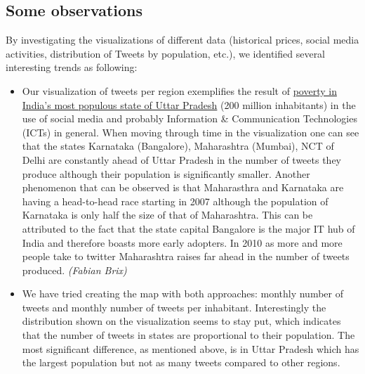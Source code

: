 \subsection*{Some observations}
By investigating the visualizations of different data (historical prices, social media activities, distribution of Tweets by population, etc.), we identified several interesting trends as following:
\begin{itemize}
\item Our visualization of tweets per region exemplifies the result of \href{http://web.worldbank.org/WBSITE/EXTERNAL/TOPICS/EXTPOVERTY/EXTPA/0,,contentMDK:20208963~menuPK:435735~pagePK:148956~piPK:216618~theSitePK:430367,00.html}{poverty in India's most populous state of Uttar Pradesh} (200 million inhabitants) in the use of social media and probably Information \& Communication Technologies (ICTs) in general. When moving through time in the visualization one can see that the states Karnataka (Bangalore), Maharashtra (Mumbai), NCT of Delhi are constantly ahead of Uttar Pradesh in the number of tweets they produce although their population is significantly smaller. Another phenomenon that can be observed is that Maharasthra and Karnataka are having a head-to-head race starting in 2007 although the population of Karnataka is only half the size of that of Maharashtra. This can be attributed to the fact that the state capital Bangalore is the major IT hub of India and therefore boasts more early adopters. In 2010 as more and more people take to twitter Maharashtra raises far ahead in the number of tweets produced. \emph{(Fabian Brix)}
\item We have tried creating the map with both approaches: monthly number of tweets and monthly number of tweets per inhabitant. Interestingly the distribution shown on the visualization seems to stay put, which indicates that the number of tweets in states are proportional to their population. The most significant difference, as mentioned above, is in Uttar Pradesh which has the largest population but not as many tweets compared to other regions.
\end{itemize}